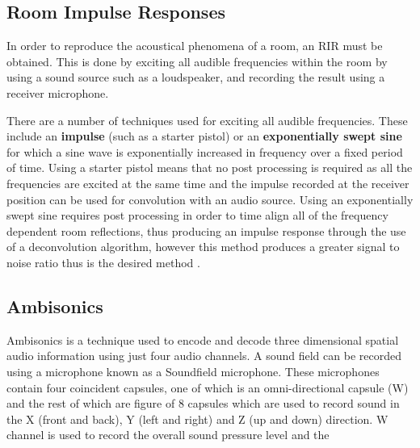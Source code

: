 \documentclass[../../main.tex]{subfiles}
\begin{document}
		\subsection{Room Impulse Responses}

			In order to reproduce the acoustical phenomena of a room, an \ac{RIR} must be obtained. This is done by exciting all audible frequencies within the room by using a sound source such as a loudspeaker, and recording the result using a receiver microphone.

			There are a number of techniques used for exciting all audible frequencies. These include an \textbf{impulse} (such as a starter pistol) or an \textbf{exponentially swept sine} for which a sine wave is exponentially increased in frequency over a fixed period of time. Using a starter pistol means that no post processing is required as all the frequencies are excited at the same time and the impulse recorded at the receiver position can be used for convolution with an audio source. Using an exponentially swept sine requires post processing in order to time align all of the frequency dependent room reflections, thus producing an impulse response through the use of a deconvolution algorithm, however this method produces a greater signal to noise ratio thus is the desired method \cite{Stan2002}. 


		\subsection{Ambisonics}

			Ambisonics is a technique used to encode and decode three dimensional spatial audio information using just four audio channels. A sound field can be recorded using a microphone known as a Soundfield microphone. These microphones contain four coincident capsules, one of which is an omni-directional capsule (W) and the rest of which are figure of 8 capsules which are used to record sound in the X (front and back), Y (left and right) and Z (up and down) direction. W channel is used to record the overall sound pressure level and the 
\end{document}

